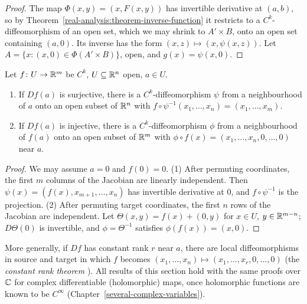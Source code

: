 \begin{proof}
The map $\Phi(x, y) = (x, F(x, y))$ has invertible derivative at $(a, b)$, so by Theorem~\ref{real-analysis:theorem-inverse-function} it restricts to a $C^k$-diffeomorphism of an open set, which we may
shrink to $A' \times B$, onto an open set containing $(a, 0)$. Its inverse has the form $(x, z) \mapsto (x, \psi(x, z))$. Let $A = \{x : (x, 0) \in \Phi(A' \times B)\}$, open, and $g(x) = \psi(x, 0)$.
\end{proof}

\begin{theorem}\label{real-analysis:theorem-submersion-immersion}
Let $f \colon U \to \mathbb{R}^m$ be $C^k$, $U \subseteq \mathbb{R}^n$ open, $a \in U$.
\begin{enumerate}
\item If $Df(a)$ is surjective, there is a $C^k$-diffeomorphism $\psi$ from a neighbourhood of $a$ onto an open subset of $\mathbb{R}^n$ with $f \circ \psi^{-1}(x_1, \ldots, x_n) = (x_1, \ldots, x_m)$.
\item If $Df(a)$ is injective, there is a $C^k$-diffeomorphism $\phi$ from a neighbourhood of $f(a)$ onto an open subset of $\mathbb{R}^m$ with $\phi \circ f(x) = (x_1, \ldots, x_n, 0, \ldots, 0)$ near $a$.
\end{enumerate}
\end{theorem}

\begin{proof}
We may assume $a = 0$ and $f(0) = 0$. (1) After permuting coordinates, the first $m$ columns of the Jacobian are linearly independent. Then $\psi(x) = (f(x), x_{m+1}, \ldots, x_n)$ has invertible
derivative at $0$, and $f \circ \psi^{-1}$ is the projection. (2) After permuting target coordinates, the first $n$ rows of the Jacobian are independent. Let $\Theta(x, y) = f(x) + (0, y)$ for $x \in U$,
$y \in \mathbb{R}^{m-n}$; $D\Theta(0)$ is invertible, and $\phi = \Theta^{-1}$ satisfies $\phi(f(x)) = (x, 0)$.
\end{proof}

\begin{remark}\label{real-analysis:remark-constant-rank}
More generally, if $Df$ has constant rank $r$ near $a$, there are local diffeomorphisms in source and target in which $f$ becomes $(x_1, \ldots, x_n) \mapsto (x_1, \ldots, x_r, 0, \ldots, 0)$ (the
\emph{constant rank theorem} \cite[Theorem 4.12]{lee-smooth-manifolds}). All results of this section hold with the same proofs over $\mathbb{C}$ for complex differentiable (holomorphic) maps, once
holomorphic functions are known to be $C^\infty$ (Chapter~\ref{several-complex-variables}).
\end{remark}

